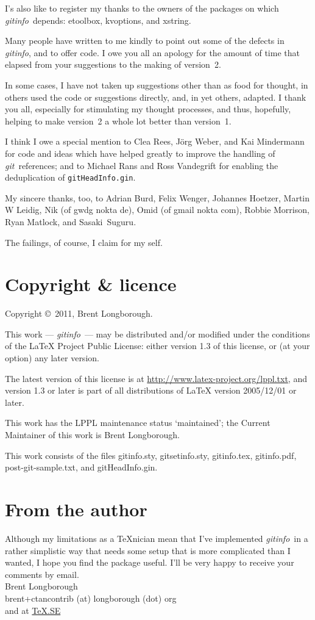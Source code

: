 \documentclass[a4paper,12pt,twoside,openany]{memoir}
\newcommand{\sfit}[1]{\textit{#1}}
\newcommand{\git}{\sfit{git}}
\newcommand{\tpname}{\sfit{gitinfo}}
\newcommand{\ginname}{gitHeadInfo.gin}
\newcommand{\metaname}{\texttt{\ginname}}
\begin{document}
I's also like to register my thanks to the owners of the packages on which
\tpname\ depends: etoolbox, kvoptions, and xstring.

Many people have written to me kindly
to point out some of the defects in \tpname, and to offer code.
I owe you all an apology for the amount of time that elapsed
from your suggestions to the making of version~2.

In some cases, I have not taken up suggestions other than as food for thought,
in others used the code or suggestions directly, and,
in yet others, adapted.
I thank you all, especially for stimulating my thought processes,
and thus, hopefully, helping to make version~2
a whole lot better than version~1.

I think I owe a special mention to Clea Rees, Jörg Weber, and Kai Mindermann
for code and ideas which have helped
greatly to improve the handling of \git\ references;
and to Michael Rans and Ross Vandegrift for enabling 
the deduplication of \metaname.

My sincere thanks, too, to
Adrian Burd,
Felix Wenger,
Johannes Hoetzer,
Martin W Leidig,
Nik (of gwdg nokta de),
Omid (of gmail nokta com),
Robbie Morrison,
Ryan Matlock, and
Sasaki~Suguru.

The failings, of course, I claim for my self.
\section{Copyright \& licence}
Copyright \copyright\ 2011, Brent Longborough.

This work --- \tpname\ --- may be distributed and/or modified under the
conditions of the LaTeX Project Public License: either version 1.3
of this license, or (at your option) any later version.

The latest version of this license is at
\url{http://www.latex-project.org/lppl.txt},
and version 1.3 or later is part of all distributions of \LaTeX
version 2005/12/01 or later.

This work has the LPPL maintenance status `maintained';
the Current Maintainer of this work is Brent Longborough.

This work consists of the files
gitinfo.sty, gitsetinfo.sty, gitinfo.tex, gitinfo.pdf,
post-git-sample.txt, and \ginname.

\section{From the author}
Although my limitations as a \TeX nician
mean that I've implemented \tpname\ in a rather simplistic way
that needs some setup that is more complicated than I wanted,
I hope you find the package useful.
I'll be very happy to receive your comments by email.\\[\baselineskip]
Brent Longborough\\[\baselineskip]
\textsf{brent+ctancontrib (at) longborough (dot) org}\\
and at \href{http://tex.stackexchange.com/users/344/brent-longborough}{\TeX.SE}
\end{document}
